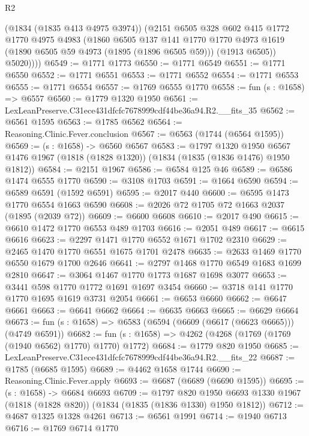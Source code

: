 \begin{lexlean}{R2}
\begin{coremodule}
          (@1834 (@1835 @413 @4975 @3974))
          (@2151
            @6505
            @328
            @602
            @415
            @1772
            @1770
            @4975
            @4983
            (@1860
              @6505
              @137
              @141
              @1770
              @1770
              @4973
              @1619
              (@1890 @6505 @59 @4973 (@1895 (@1896 @6505 @59)))
              (@1913 @6505))
            @5020))))
@6549 := @1771 @1773
@6550 := @1771 @6549
@6551 := @1771 @6550
@6552 := @1771 @6551
@6553 := @1771 @6552
@6554 := @1771 @6553
@6555 := @1771 @6554
@6557 := @1769 @6555 @1770
@6558 := fun (s : @1658) => @6557
@6560 := @1779 @1320 @1950
@6561 := LexLeanPreserve.C31ece431dfcfc7678999cdf44be36a94.R2.__fits_35
@6562 := @6561 @1595
@6563 := @1785 @6562
@6564 := Reasoning.Clinic.Fever.conclusion
@6567 := @6563 (@1744 (@6564 @1595))
@6569 := (s : @1658) -> @6560 @6567
@6583 := @1797
    @1320
    @1950
    @6567
    @1476
    @1967
    (@1818 (@1828 @1320))
    (@1834 (@1835 (@1836 @1476) @1950 @1812))
@6584 := @2151 @1967
@6586 := @6584 @125 @46
@6589 := @6586 @1474 @6555 @1770
@6590 := @3108 @1703
@6591 := @1664 @6590
@6594 := @6589 @6591 (@1592 @6591)
@6595 := @2017 @440
@6600 := @6595 @1473 @1770 @6554 @1663 @6590
@6608 := @2026 @72 @1705 @72 @1663 @2037 (@1895 (@2039 @72))
@6609 := @6600 @6608
@6610 := @2017 @490
@6615 := @6610 @1472 @1770 @6553 @489 @1703
@6616 := @2051 @489
@6617 := @6615 @6616
@6623 := @2297 @1471 @1770 @6552 @1671 @1702 @2310
@6629 := @2465 @1470 @1770 @6551 @1675 @1701 @2478
@6635 := @2633 @1469 @1770 @6550 @1679 @1700 @2646
@6641 := @2797 @1468 @1770 @6549 @1683 @1699 @2810
@6647 := @3064 @1467 @1770 @1773 @1687 @1698 @3077
@6653 := @3441 @598 @1770 @1772 @1691 @1697 @3454
@6660 := @3718 @141 @1770 @1770 @1695 @1619 @3731 @2054
@6661 := @6653 @6660
@6662 := @6647 @6661
@6663 := @6641 @6662
@6664 := @6635 @6663
@6665 := @6629 @6664
@6673 := fun (s : @1658) => @6583 (@6594 (@6609 (@6617 (@6623 @6665))) (@4749 @6591))
@6682 := fun (s : @1658) => @4262 (@4268 (@1769 (@1769 (@1940 @6562) @1770) @1770) @1772)
@6684 := @1779 @820 @1950
@6685 := LexLeanPreserve.C31ece431dfcfc7678999cdf44be36a94.R2.__fits_22
@6687 := @1785 (@6685 @1595)
@6689 := @4462 @1658 @1744
@6690 := Reasoning.Clinic.Fever.apply
@6693 := @6687 (@6689 (@6690 @1595))
@6695 := (s : @1658) -> @6684 @6693
@6709 := @1797
    @820
    @1950
    @6693
    @1330
    @1967
    (@1818 (@1828 @820))
    (@1834 (@1835 (@1836 @1330) @1950 @1812))
@6712 := @4687 @1325 @1328 @4261
@6713 := @6561 @1991
@6714 := @1940 @6713
@6716 := @1769 @6714 @1770

\end{coremodule}
\end{lexlean}
